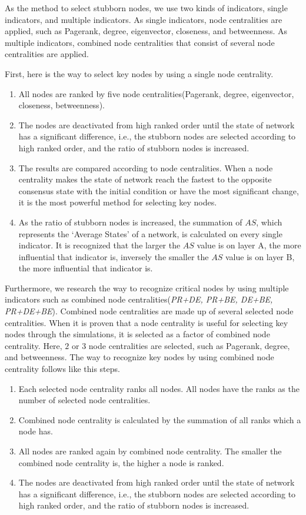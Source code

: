 As the method to select stubborn nodes, we use two kinds of indicators, single indicators, and multiple indicators. As single indicators, node centralities are applied, such as Pagerank, degree, eigenvector, closeness, and betweenness. As multiple indicators, combined node centralities that consist of several node centralities are applied.
  
First, here is the way to select key nodes by using a single node centrality.
\begin{enumerate}
	\item All nodes are ranked by five node centralities(Pagerank, degree, eigenvector, closeness, betweenness).
	\item The nodes are deactivated from high ranked order until the state of network has a significant difference, i.e., the stubborn nodes are selected according to high ranked order, and the ratio of stubborn nodes is increased. 
	\item The results are compared according to node centralities. When a node centrality makes the state of network reach the fastest to the opposite consensus state with the initial condition or have the most significant change, it is the most powerful method for selecting key nodes.
	\item As the ratio of stubborn nodes is increased, the summation of $AS$, which represents the `Average States' of a network, is calculated on every single indicator. It is recognized that the larger the $AS$ value is on layer A, the more influential that indicator is, inversely the smaller the $AS$ value is on layer B, the more influential that indicator is.
\end{enumerate}

Furthermore, we research the way to recognize critical nodes by using multiple indicators such as combined node centralities(\textit{PR+DE, PR+BE, DE+BE, PR+DE+BE}). Combined node centralities are made up of several selected node centralities. When it is proven that a node centrality is useful for selecting key nodes through the simulations, it is selected as a factor of combined node centrality. Here, $2$ or $3$ node centralities are selected, such as Pagerank, degree, and betweenness. 
The way to recognize key nodes by using combined node centrality follows like this steps. 
\begin{enumerate}
	\item  Each selected node centrality ranks all nodes. All nodes have the ranks as the number of selected node centralities.  
	\item Combined node centrality is calculated by the summation of all ranks which a node has. 
	\item All nodes are ranked again by combined node centrality. The smaller the combined node centrality is, the higher a node is ranked.        
	\item The nodes are deactivated from high ranked order until the state of network has a significant difference, i.e., the stubborn nodes are selected according to high ranked order, and the ratio of stubborn nodes is increased. 
\end{enumerate}


